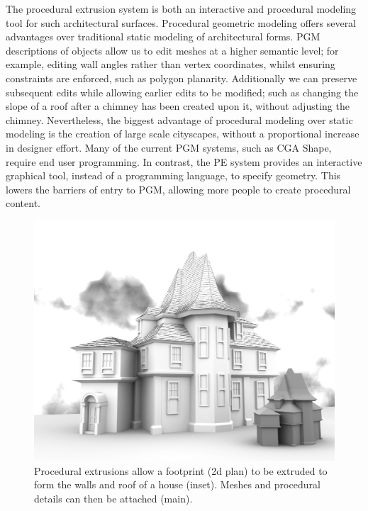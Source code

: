 The procedural extrusion system is both an interactive and procedural modeling tool for such architectural surfaces. Procedural geometric modeling offers several advantages over traditional static modeling of architectural forms. PGM descriptions of objects allow us to edit meshes at a higher semantic level; for example, editing wall angles rather than vertex coordinates, whilst ensuring constraints are enforced, such as polygon planarity. Additionally we can preserve subsequent edits while allowing earlier edits to be modified; such as changing the slope of a roof after a chimney has been created upon it, without adjusting the chimney. Nevertheless, the biggest advantage of procedural modeling over static modeling is the creation of large scale cityscapes, without a proportional increase in designer effort. Many of the current PGM systems, such as CGA Shape\cite{Pascal06}, require end user programming. In contrast, the PE system provides an interactive graphical tool, instead of a programming language, to specify geometry. This lowers the barriers of entry to PGM, allowing more people to create procedural content.

\begin{figure}
  \centering
  \includegraphics[width=1.0\columnwidth]{SingleHouse.png}
  \caption[A house created using procedural extrusions.]{\label{fig:SingleHouse}
Procedural extrusions allow a footprint (2d plan) to be extruded to form the walls and roof of a house (inset). Meshes and procedural details can then be attached (main).}
\end{figure}

